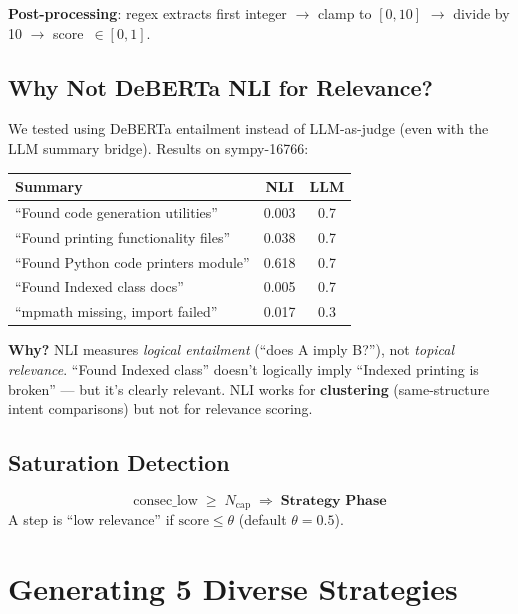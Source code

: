 \documentclass[10pt,a4paper,twocolumn]{article}
\begin{document}
\textbf{Post-processing}: regex extracts first integer $\to$ clamp to $[0,10]$ $\to$ divide by 10 $\to$ score~$\in [0,1]$.

\subsection{Why Not DeBERTa NLI for Relevance?}

We tested using DeBERTa entailment instead of LLM-as-judge (even with the LLM summary bridge). Results on sympy-16766:

\begin{scriptsize}
\begin{tabular}{@{}p{}cc@{}}
\toprule
\textbf{Summary} & \textbf{NLI} & \textbf{LLM} \\
\midrule
``Found code generation utilities'' & 0.003 & 0.7 \\
``Found printing functionality files'' & 0.038 & 0.7 \\
``Found Python code printers module'' & 0.618 & 0.7 \\
``Found Indexed class docs'' & 0.005 & 0.7 \\
``mpmath missing, import failed'' & 0.017 & 0.3 \\
\bottomrule
\end{tabular}
\end{scriptsize}

\textbf{Why?} NLI measures \emph{logical entailment} (``does A imply B?''), not \emph{topical relevance}. ``Found Indexed class'' doesn't logically imply ``Indexed printing is broken'' --- but it's clearly relevant. NLI works for \textbf{clustering} (same-structure intent comparisons) but not for relevance scoring.

\subsection{Saturation Detection}

\begin{mathbox}[title=Saturation Rule]
\[
\text{consec\_low} \;\ge\; N_{\text{cap}} \;\Longrightarrow\; \textbf{Strategy Phase}
\]
A step is ``low relevance'' if $\text{score} \le \theta$\; (default $\theta = 0.5$).
\end{mathbox}


\section{Generating 5 Diverse Strategies}
\end{document}
